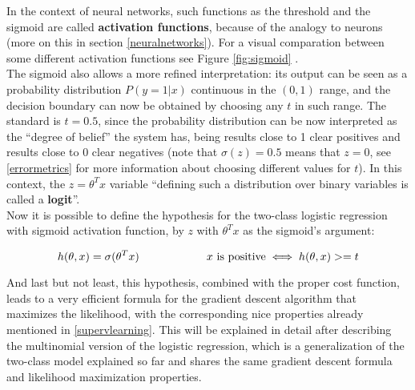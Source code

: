 In the context of neural networks, such functions as the threshold and the sigmoid are called \textbf{activation functions}, because of the analogy to neurons (more on this in section \ref{neuralnetworks}). For a visual comparation between some different activation functions see Figure \ref{fig:sigmoid} .\\


The sigmoid also allows a more refined interpretation: its output can be seen as a probability distribution \(P(y=1|x)\)\cite[p.181]{goodfellow} continuous in the \((0, 1)\) range, and the decision boundary can now be obtained by choosing any \(t\) in such range. The standard is \(t=0.5\), since the probability distribution can be now interpreted as the ``degree of belief'' the system has, being results close to 1 clear positives and results close to 0 clear negatives (note that \(\sigma(z)=0.5\) means that \(z=0\), see \ref{errormetrics} for more information about choosing different values for \(t\)). In this context, the \(z = \theta^Tx\) variable ``defining such a distribution over binary variables is called a \textbf{logit}''\cite[p.182]{goodfellow}.\\

Now it is possible to define the hypothesis for the two-class logistic regression with sigmoid activation function, by \(z\) with \(\theta^Tx\) as the sigmoid's argument:

\begin{equation*}
  h(\theta, x) = \sigma(\theta^Tx) \qquad \qquad \qquad x \text{ is positive} \iff h(\theta, x)>=t\\
\end{equation*}

And last but not least, this hypothesis, combined with the proper cost function, leads to a very efficient formula for the gradient descent algorithm that maximizes the likelihood\cite[p.184]{goodfellow}, with the corresponding nice properties already mentioned in \ref{supervlearning}. This will be explained in detail after describing the multinomial version of the logistic regression, which is a generalization of the two-class model explained so far and shares the same gradient descent formula and likelihood maximization properties.



